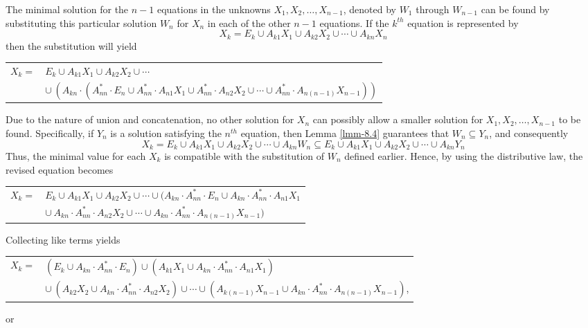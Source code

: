 \begin{lmm}
The minimal solution for the $n-1$ equations in the unknowns $X_1,X_2,\ldots,
X_{n-1}$, denoted by $W_1$ through $W_{n-1}$ can be found by substituting this
particular solution $W_n$ for $X_n$ in each of the other $n-1$ equations. If the
$k^{th}$ equation is represented by
\[ X_k = E_k\cup A_{k1}X_1\cup A_{k2}X_2\cup\cdots\cup A_{kn}X_n \]
then the substitution will yield
\begin{center}\begin{tabular}{r@{ }l}
$X_k =$ & $E_k\cup A_{k1}X_1\cup A_{k2}X_2\cup\cdots$ \\
& $\cup\ (A_{kn}\cdot(A^*_{nn}\cdot E_n\cup A^*_{nn}\cdot A_{n1}X_1\cup A^*_{nn}
	\cdot A_{n2}X_2\cup\cdots\cup A^*_{nn}\cdot A_{n(n-1)}X_{n-1}))$
\end{tabular}\end{center}
Due to the nature of union and concatenation, no other solution for $X_n$ can
possibly allow a smaller solution for $X_1,X_2,\ldots,X_{n-1}$ to be found.
Specifically, if $Y_n$ is a solution satisfying the $n^{th}$ equation, then Lemma
\ref{lmm-8.4} guarantees that $W_n \subseteq Y_n$, and consequently
\[ X_k = E_k\cup A_{k1}X_1\cup A_{k2}X_2\cup\cdots\cup A_{kn}W_n \subseteq E_k
	\cup A_{k1}X_1\cup A_{k2}X_2\cup\cdots\cup A_{kn}Y_n \]
Thus, the minimal value for each $X_k$ is compatible with the substitution of
$W_n$ defined earlier. Hence, by using the distributive law, the revised
equation becomes
\begin{center}\begin{tabular}{r@{ }l}
$X_k =$ & $E_k\cup A_{k1}X_1\cup A_{k2}X_2\cup\cdots\cup(A_{kn}\cdot A^*_{nn}\cdot
	E_n\cup A_{kn}\cdot A^*_{nn}\cdot A_{n1}X_1$ \\
& $\cup\ A_{kn}\cdot A^*_{nn}\cdot A_{n2}X_2\cup\cdots\cup A_{kn}\cdot A^*_{nn}
	\cdot A_{n(n-1)}X_{n-1})$
\end{tabular}\end{center}
Collecting like terms yields
\begin{center}\begin{tabular}{r@{ }l}
$X_k =$ & $(E_k\cup A_{kn}\cdot A^*_{nn}\cdot E_n)\cup(A_{k1}X_1\cup A_{kn}\cdot
	A^*_{nn}\cdot A_{n1}X_1)$ \\
& $\cup\ (A_{k2}X_2\cup A_{kn}\cdot A^*_{nn}\cdot A_{n2}X_2)\cup\cdots\cup
	(A_{k(n-1)}X_{n-1}\cup A_{kn}\cdot A^*_{nn}\cdot A_{n(n-1)}X_{n-1})$,
\end{tabular}\end{center}
or
\begin{center}\begin{tabular}{r@{ }l}

\end{tabular}
\end{center}
\end{lmm}
